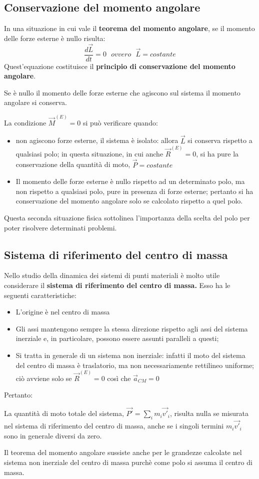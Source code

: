 \documentclass{article}
\numberwithin{equation}{subsection}
\begin{document}
\subsection{Conservazione del momento angolare}
In una situazione in cui vale il \textbf{teorema del momento angolare}, se il momento delle forze esterne è nullo risulta:
\begin{equation}
    \frac{d\vec{L}}{dt}=0 \ \ \ ovvero \ \ \ \vec{L}=costante
\end{equation}
Quest'equazione costituisce il \textbf{principio di conservazione del momento angolare}.
\begin{shaded}
Se è nullo il momento delle forze esterne che agiscono sul sistema il momento angolare si conserva.
\end{shaded}
La condizione $\vec{M}^{(E)}=0$ si può verificare quando:
\begin{itemize}
    \item non agiscono forze esterne, il sistema è isolato: allora $\vec{L}$ si conserva rispetto a qualsiasi polo; in questa situazione, in cui anche $\vec{R}^{(E)}=0$, si ha pure la conservazione della quantità di moto, $\vec{P}=costante$
    \item Il momento delle forze esterne è nullo rispetto ad un determinato polo, ma non rispetto a qualsiasi polo, pure in presenza di forze esterne; pertanto si ha conservazione del momento angolare solo se calcolato rispetto a quel polo.
\end{itemize}
Questa seconda situazione fisica sottolinea l'importanza della scelta del polo per poter risolvere determinati problemi.
\subsection{Sistema di riferimento del centro di massa}
Nello studio della dinamica dei sistemi di punti materiali è molto utile considerare il \textbf{sistema di riferimento del centro di massa.} Esso ha le seguenti caratteristiche:
\begin{itemize}
    \item L'origine è nel centro di massa
    \item Gli assi mantengono sempre la stessa direzione rispetto agli assi del sistema inerziale e, in particolare, possono essere assunti paralleli a questi;
    \item Si tratta in generale di un sistema non inerziale: infatti il moto del sistema del centro di massa è traslatorio, ma non necessariamente rettilineo uniforme; ciò avviene solo se $\vec{R}^{(E)}=0$ così che $\vec{a}_{CM}=0$
\end{itemize}
Pertanto:
\begin{shaded}
    La quantità di moto totale del sistema, $\vec{P'}=\sum_im_i\vec{v'}_i$, risulta nulla se misurata nel sistema di riferimento del centro di massa, anche se i singoli termini $m_i\vec{v'}_i$ sono in generale diversi da zero.
\end{shaded}
\begin{shaded}
    Il teorema del momento angolare sussiste anche per le grandezze calcolate nel sistema non inerziale del centro di massa purchè come polo si assuma il centro di massa.
\end{shaded}
\end{document}
